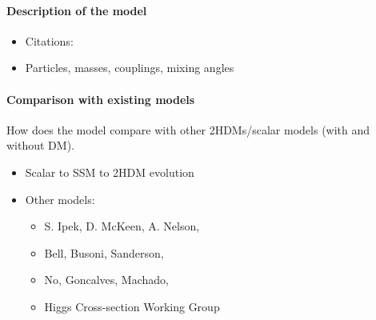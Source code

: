 \paragraph{Description of the model}

\begin{itemize}

\item Citations: \cite{Bauer:2017ota, Bell:2016ekl, Ipek:2014gua, No:2015xqa, Goncalves:2016iyg}

\item Particles, masses, couplings, mixing angles

\end{itemize}

\paragraph{Comparison with existing models}

How does the model compare with other 2HDMs/scalar models (with and without DM). 

\begin{itemize}
    \item Scalar to SSM to 2HDM evolution
    \item Other models:
    \begin{itemize}
        \item S. Ipek, D. McKeen, A. Nelson, \cite{Ipek:2014gua}
        \item Bell, Busoni, Sanderson, \cite{Bell:2016ekl}
        \item No, Goncalves, Machado, \cite{No:2015xqa, Goncalves:2016iyg}
        \item Higgs Cross-section Working Group
    \end{itemize}
\end{itemize}
